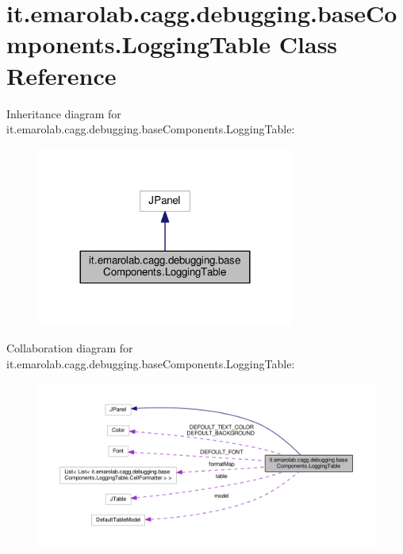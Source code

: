 \hypertarget{classit_1_1emarolab_1_1cagg_1_1debugging_1_1baseComponents_1_1LoggingTable}{\section{it.\-emarolab.\-cagg.\-debugging.\-base\-Components.\-Logging\-Table Class Reference}
\label{classit_1_1emarolab_1_1cagg_1_1debugging_1_1baseComponents_1_1LoggingTable}
}


Inheritance diagram for it.\-emarolab.\-cagg.\-debugging.\-base\-Components.\-Logging\-Table\-:\nopagebreak
\begin{figure}[H]
\begin{center}
\leavevmode
\includegraphics[width=240pt]{classit_1_1emarolab_1_1cagg_1_1debugging_1_1baseComponents_1_1LoggingTable__inherit__graph}
\end{center}
\end{figure}


Collaboration diagram for it.\-emarolab.\-cagg.\-debugging.\-base\-Components.\-Logging\-Table\-:\nopagebreak
\begin{figure}[H]
\begin{center}
\leavevmode
\includegraphics[width=350pt]{classit_1_1emarolab_1_1cagg_1_1debugging_1_1baseComponents_1_1LoggingTable__coll__graph}
\end{center}
\end{figure}
